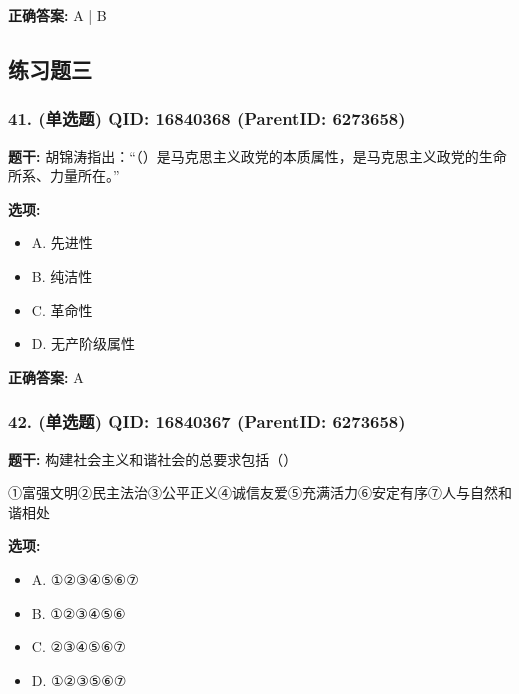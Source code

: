 \documentclass[12pt,UTF8]{ctexart}
\begin{document}
\textbf{正确答案:}
A | B

\vspace{0.3em}\hrulefill\vspace{0.7em}

\subsection*{练习题三}

\subsubsection*{41. (单选题) \small QID: 16840368 (ParentID: 6273658)}

\textbf{题干:}
胡锦涛指出：“（）是马克思主义政党的本质属性，是马克思主义政党的生命所系、力量所在。”



\textbf{选项:}
\begin{itemize}[leftmargin=*]

  \item A. 先进性

  \item B. 纯洁性

  \item C. 革命性

  \item D. 无产阶级属性

\end{itemize}

\textbf{正确答案:}
A

\vspace{0.3em}\hrulefill\vspace{0.7em}

\subsubsection*{42. (单选题) \small QID: 16840367 (ParentID: 6273658)}

\textbf{题干:}
构建社会主义和谐社会的总要求包括（）
\par
①富强文明②民主法治③公平正义④诚信友爱⑤充满活力⑥安定有序⑦人与自然和谐相处



\textbf{选项:}
\begin{itemize}[leftmargin=*]

  \item A. ①②③④⑤⑥⑦

  \item B. ①②③④⑤⑥

  \item C. ②③④⑤⑥⑦

  \item D. ①②③⑤⑥⑦

\end{itemize}
\end{document}
